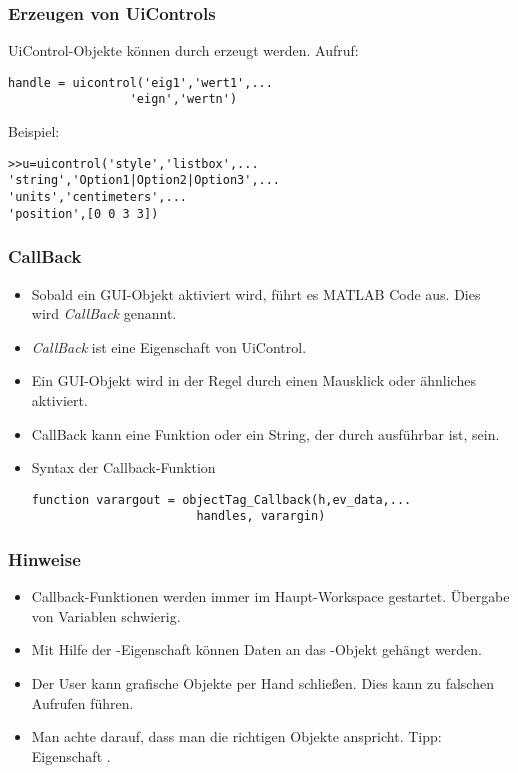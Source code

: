 %
%
\begin{frame}[fragile]\frametitle{Erzeugen von UiControls}
UiControl-Objekte k\"onnen durch \alert{ } erzeugt
werden. Aufruf: 
\begin{lstlisting}
handle = uicontrol('eig1','wert1',...
                 'eign','wertn')
\end{lstlisting}
\alert{Beispiel:}
\begin{lstlisting}
>>u=uicontrol('style','listbox',...
'string','Option1|Option2|Option3',...
'units','centimeters',...
'position',[0 0 3 3])
\end{lstlisting} 
\end{frame}

%
%
\begin{frame}[fragile]\frametitle{CallBack}
\begin{itemize}
\item Sobald ein GUI-Objekt aktiviert wird, f\"uhrt es MATLAB Code aus. Dies
  wird {\it CallBack} genannt.
\item {\it CallBack} ist eine Eigenschaft von UiControl.
\item Ein GUI-Objekt wird in der Regel durch einen Mausklick oder \"ahnliches
  aktiviert. 
\item CallBack kann eine Funktion oder ein String, der durch 
  ausf\"uhrbar ist, sein. 
\item Syntax der Callback-Funktion
{\tiny \begin{verbatim}
function varargout = objectTag_Callback(h,ev_data,...
                       handles, varargin)
\end{verbatim}
} 
\end{itemize}
\end{frame}
% 
% 
\begin{frame}[fragile]\frametitle{Hinweise}
\begin{itemize}
\item Callback-Funktionen werden immer im Haupt-Workspace
  gestartet. \"Ubergabe von Variablen schwierig.
\item Mit Hilfe der -Eigenschaft  k\"onnen Daten an
  das -Objekt geh\"angt werden.
\item Der User kann grafische Objekte per Hand schlie{\ss}en. Dies kann zu
  falschen Aufrufen f\"uhren.
\item Man achte darauf, dass man die richtigen Objekte anspricht. Tipp:
  Eigenschaft . 
\end{itemize}
\end{frame}
